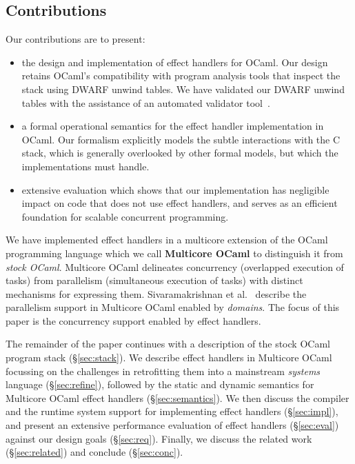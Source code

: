 \documentclass[sigplan,screen]{acmart}
\begin{document}
\subsection{Contributions}

Our contributions are to present:

\begin{itemize}
	\item the design and implementation of effect handlers for OCaml. Our design
		retains OCaml's compatibility with program analysis tools that inspect the
		stack using DWARF unwind tables. We have validated our DWARF unwind tables
		with the assistance of an automated validator tool~\cite{Bastian19}.
	\item a formal operational semantics for the effect handler implementation in
		OCaml. Our formalism explicitly models the subtle interactions with the C
		stack, which is generally overlooked by other formal models, but which the
		implementations must handle.
	\item extensive evaluation which shows that our implementation has negligible
		impact on code that does not use effect handlers, and serves as an
		efficient foundation for scalable concurrent programming.
\end{itemize}

We have implemented effect handlers in a multicore extension of the OCaml
programming language which we call \textbf{Multicore OCaml} to distinguish it
from \emph{stock OCaml}. Multicore OCaml delineates concurrency (overlapped
execution of tasks) from parallelism (simultaneous execution of tasks) with
distinct mechanisms for expressing them. Sivaramakrishnan et
al.~\cite{Sivaramakrishnan20} describe the parallelism support in Multicore
OCaml enabled by \emph{domains}. The focus of this paper is the concurrency
support enabled by effect handlers.

The remainder of the paper continues with a description of the stock OCaml
program stack (\S\ref{sec:stack}). We describe effect handlers in Multicore
OCaml focussing on the challenges in retrofitting them into a mainstream
\emph{systems} language (\S\ref{sec:refine}), followed by the static and
dynamic semantics for Multicore OCaml effect handlers (\S\ref{sec:semantics}).
We then discuss the compiler and the runtime system support for implementing
effect handlers (\S\ref{sec:impl}), and present an extensive performance
evaluation of effect handlers (\S\ref{sec:eval}) against our design goals
(\S\ref{sec:req}). Finally, we discuss the related work (\S\ref{sec:related})
and conclude (\S\ref{sec:conc}).
\end{document}
